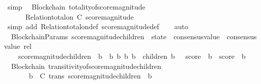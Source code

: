 \begin{isabellebody}
\ simp%
\endisatagproof
{\isafoldproof}%
%
\isadelimproof
\isanewline
%
\endisadelimproof
\isanewline
{}\isamarkupfalse%
\ {\isacharparenleft}\ Blockchain{\isacharparenright}\ totality{\isacharunderscore}of{\isacharunderscore}score{\isacharunderscore}magnitude\ {\isacharcolon}\isanewline
\ \ {\isachardoublequoteopen}{\isasymforall}\ {\isasymsigma}\ {\isasymin}\ {\isasymSigma}{\isachardot}\ Relation{\isachardot}total{\isacharunderscore}on\ C\ {\isacharparenleft}score{\isacharunderscore}magnitude\ {\isasymsigma}{\isacharparenright}{\isachardoublequoteclose}\isanewline
%
\isadelimproof
\ \ %
\endisadelimproof
%
\isatagproof
{}\isamarkupfalse%
\ {\isacharparenleft}simp\ add{\isacharcolon}\ Relation{\isachardot}total{\isacharunderscore}on{\isacharunderscore}def\ score{\isacharunderscore}magnitude{\isacharunderscore}def{\isacharparenright}\isanewline
\ \ \isamarkupfalse%
\ auto%
\endisatagproof
{\isafoldproof}%
%
\isadelimproof
\isanewline
%
\endisadelimproof
\isanewline
\isanewline
{}\isamarkupfalse%
\ {\isacharparenleft}\ BlockchainParams{\isacharparenright}\ score{\isacharunderscore}magnitude{\isacharunderscore}children\ {\isacharcolon}{\isacharcolon}\ {\isachardoublequoteopen}state\ {\isasymRightarrow}\ consensus{\isacharunderscore}value\ {\isasymRightarrow}\ consensus{\isacharunderscore}value\ rel{\isachardoublequoteclose}\isanewline
\ \ \ \isanewline
\ \ \ \ {\isachardoublequoteopen}score{\isacharunderscore}magnitude{\isacharunderscore}children\ {\isasymsigma}\ b\ {\isacharequal}\ {\isacharbraceleft}{\isacharparenleft}b{}{\isacharcomma}\ b{}{\isacharparenright}{\isachardot}\ {\isacharbraceleft}b{}{\isacharcomma}\ b{}{\isacharbraceright}\ {\isasymsubseteq}\ children\ {\isacharparenleft}b{\isacharcomma}\ {\isasymsigma}{\isacharparenright}\ {\isasymand}\ score\ {\isasymsigma}\ b{}\ {\isasymle}\ score\ {\isasymsigma}\ b{}{\isacharbraceright}{\isachardoublequoteclose}\ \isanewline
\isanewline
{}\isamarkupfalse%
\ {\isacharparenleft}\ Blockchain{\isacharparenright}\ transitivity{\isacharunderscore}of{\isacharunderscore}score{\isacharunderscore}magnitude{\isacharunderscore}children\ {\isacharcolon}\isanewline
\ \ {\isachardoublequoteopen}{\isasymforall}\ {\isasymsigma}\ {\isasymin}\ {\isasymSigma}{\isachardot}\ {\isasymforall}\ b\ {\isasymin}\ C{\isachardot}\ trans\ {\isacharparenleft}score{\isacharunderscore}magnitude{\isacharunderscore}children\ {\isasymsigma}\ b{\isacharparenright}{\isachardoublequoteclose}\isanewline

\end{isabellebody}
